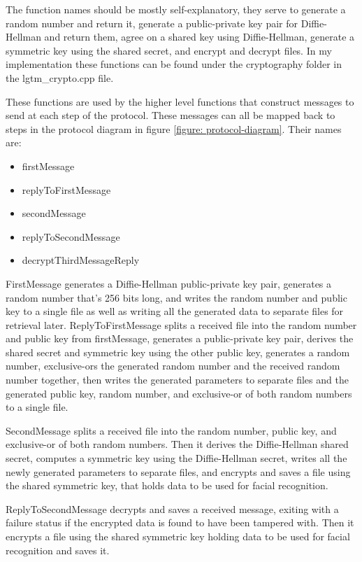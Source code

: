 \documentclass[12pt]{report}
\begin{document}
The function names should be mostly self-explanatory, they serve to generate a random number and return it, generate a public-private key pair for Diffie-Hellman and return them, agree on a shared key using Diffie-Hellman, generate a symmetric key using the shared secret, and encrypt and decrypt files. In my implementation these functions can be found under the cryptography folder in the lgtm\_crypto.cpp file. \par

These functions are used by the higher level functions that construct messages to send at each step of the protocol. These messages can all be mapped back to steps in the protocol diagram in figure \ref{figure: protocol-diagram}. Their names are: 

\begin{itemize}
    \item firstMessage
    \item replyToFirstMessage
    \item secondMessage
    \item replyToSecondMessage
    \item decryptThirdMessageReply
\end{itemize}

FirstMessage generates a Diffie-Hellman public-private key pair, generates a random number that's 256 bits long, and writes the random number and public key to a single file as well as writing all the generated data to separate files for retrieval later. ReplyToFirstMessage splits a received file into the random number and public key from firstMessage, generates a public-private key pair, derives the shared secret and symmetric key using the other public key, generates a random number, exclusive-ors the generated random number and the received random number together, then writes the generated parameters to separate files and the generated public key, random number, and exclusive-or of both random numbers to a single file. \par

SecondMessage splits a received file into the random number, public key, and exclusive-or of both random numbers. Then it derives the Diffie-Hellman shared secret, computes a symmetric key using the Diffie-Hellman secret, writes all the newly generated parameters to separate files, and encrypts and saves a file using the shared symmetric key, that holds data to be used for facial recognition. \par

ReplyToSecondMessage decrypts and saves a received message, exiting with a failure status if the encrypted data is found to have been tampered with. Then it encrypts a file using the shared symmetric key holding data to be used for facial recognition and saves it. \par
\end{document}

